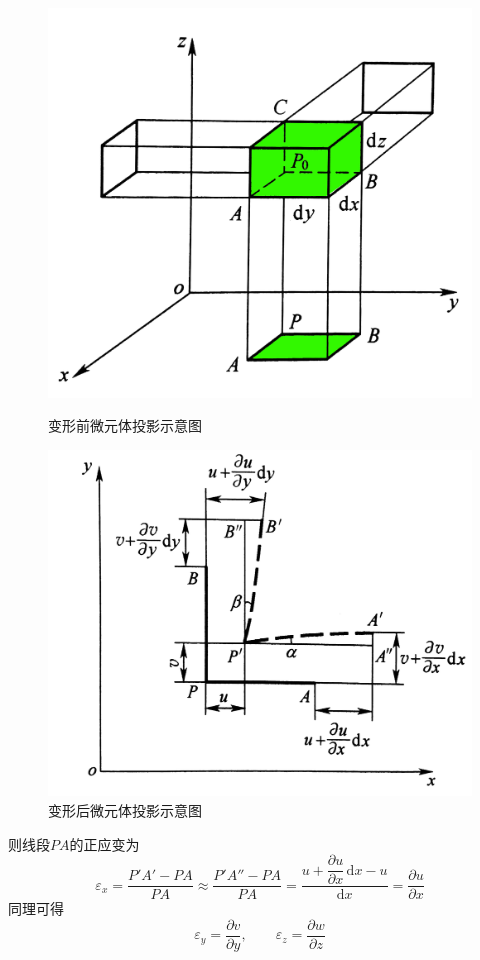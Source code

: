 \documentclass[10pt,a4]{article}
\numberwithin{equation}{section}
\renewcommand{\d}{\text{d}}
\begin{document}
	\begin{figure}[!htb]
		\begin{minipage}{0.5\linewidth}
			\centering
			\includegraphics[width=0.8\linewidth]{pic/变形1.png}
			\caption{变形前微元体投影示意图}
			\label{BX1}
		\end{minipage}
		\begin{minipage}{0.5\linewidth}
			\centering
			\includegraphics[width=0.9\linewidth]{pic/变形2.png}
			\caption{变形后微元体投影示意图}
			\label{BX2}
		\end{minipage}
	\end{figure}
	
	则线段$PA$的正应变为
	\begin{equation}
		\varepsilon_x = \dfrac{P'A' - PA}{PA} \approx \dfrac{P'A'' - PA}{PA} = \dfrac{u + \dfrac{\partial u}{\partial x}\,\d x - u}{\d x} = \dfrac{\partial u}{\partial x}
	\end{equation}
	同理可得
	\begin{equation}
		\varepsilon_y = \dfrac{\partial v}{\partial y}, \qquad \varepsilon_z = \dfrac{\partial w}{\partial z}
	\end{equation}
	
\end{document}
